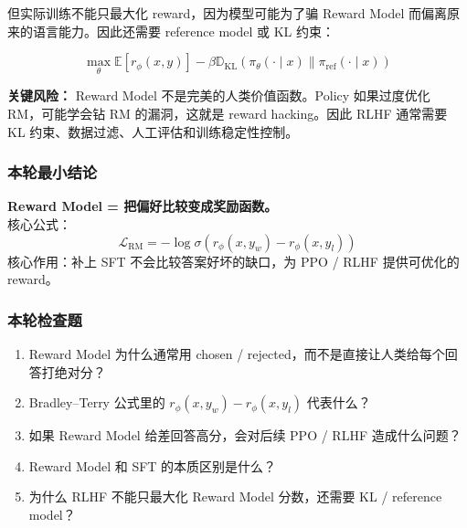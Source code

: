 但实际训练不能只最大化 reward，因为模型可能为了骗 Reward Model 而偏离原来的语言能力。因此还需要 reference model 或 KL 约束：

\[
\max_\theta
\mathbb{E}[r_\phi(x, y)]
-
\beta \mathbb{D}_\text{KL}
\left(
\pi_\theta(\cdot \mid x)
\|
\pi_\text{ref}(\cdot \mid x)
\right)
\]

\begin{warnbox}
\textbf{关键风险：} Reward Model 不是完美的人类价值函数。Policy 如果过度优化 RM，可能学会钻 RM 的漏洞，这就是 reward hacking。因此 RLHF 通常需要 KL 约束、数据过滤、人工评估和训练稳定性控制。
\end{warnbox}

\subsubsection{本轮最小结论}

\begin{summarybox}
\textbf{Reward Model = 把偏好比较变成奖励函数。}\\
核心公式：
\[
\mathcal{L}_\text{RM}
=
-
\log
\sigma\left(r_\phi(x, y_w) - r_\phi(x, y_l)\right)
\]
核心作用：补上 SFT 不会比较答案好坏的缺口，为 PPO / RLHF 提供可优化的 reward。
\end{summarybox}

\subsubsection{本轮检查题}

\begin{enumerate}[leftmargin=1.5em]
  \item Reward Model 为什么通常用 chosen / rejected，而不是直接让人类给每个回答打绝对分？
  \item Bradley--Terry 公式里的 $r_\phi(x, y_w) - r_\phi(x, y_l)$ 代表什么？
  \item 如果 Reward Model 给差回答高分，会对后续 PPO / RLHF 造成什么问题？
  \item Reward Model 和 SFT 的本质区别是什么？
  \item 为什么 RLHF 不能只最大化 Reward Model 分数，还需要 KL / reference model？
\end{enumerate}
